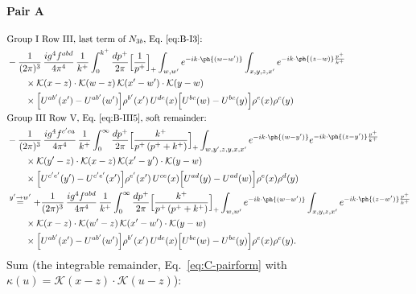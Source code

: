 \paragraph{Pair A}
\begingroup\color{pA}
\begin{align}
&\text{Group I Row III, last term of $N_{3b}$, Eq.~\eqref{eq:B-I3}:}\notag\\
&-\frac{1}{(2\pi)^{3}}\,\frac{ig^{4}f^{abd}}{4\pi^{4}}\,\frac{1}{k^{+}}\int_{0}^{k^{+}}\frac{dp^{+}}{2\pi}\Big[\frac{1}{p^{+}}\Big]_{+}\int_{w,w'}e^{-ik\cdot\ph{(w-w')}}\int_{x,y,z,x'}e^{-ik\cdot\ph{(z-w)}\frac{p^{+}}{k^{+}}}\notag\\
&\qquad\times\mathcal{K}(x-z)\cdot\mathcal{K}(w-z)\,\mathcal{K}(x'-w')\cdot\mathcal{K}(y-w)\notag\\
&\qquad\times\Big[U^{ab'}(x')-U^{ab'}(w')\Big]\rho^{b'}(x')\,U^{de}(x)\Big[U^{bc}(w)-U^{bc}(y)\Big]\rho^{e}(x)\rho^{c}(y)\notag\\
&\text{Group III Row V, Eq.~\eqref{eq:B-III5}, soft remainder:}\notag\\
&-\frac{1}{(2\pi)^{3}}\,\frac{ig^{4}f^{c'ca}}{4\pi^{4}}\,\frac{1}{k^{+}}\int_{0}^{\infty}\frac{dp^{+}}{2\pi}\Big[\frac{k^{+}}{p^{+}\,(p^{+}+k^{+})}\Big]_{+}\int_{w,y',z,y,x,x'}e^{-ik\cdot\ph{(w-y')}}e^{-ik\cdot\ph{(z-y')}\frac{p^{+}}{k^{+}}}\notag\\
&\qquad\times\mathcal{K}(y'-z)\cdot\mathcal{K}(x-z)\,\mathcal{K}(x'-y')\cdot\mathcal{K}(y-w)\notag\\
&\qquad\times\Big[U^{c'e'}(y')-U^{c'e'}(x')\Big]\rho^{e'}(x')\,U^{ce}(x)\Big[U^{ad}(y)-U^{ad}(w)\Big]\rho^{e}(x)\rho^{d}(y)\notag\\
&\overset{y'\to w'}{=}+\frac{1}{(2\pi)^{3}}\,\frac{ig^{4}f^{abd}}{4\pi^{4}}\,\frac{1}{k^{+}}\int_{0}^{\infty}\frac{dp^{+}}{2\pi}\Big[\frac{k^{+}}{p^{+}\,(p^{+}+k^{+})}\Big]_{+}\int_{w,w'}e^{-ik\cdot\ph{(w-w')}}\int_{x,y,z,x'}e^{-ik\cdot\ph{(z-w')}\frac{p^{+}}{k^{+}}}\notag\\
&\qquad\times\mathcal{K}(x-z)\cdot\mathcal{K}(w'-z)\,\mathcal{K}(x'-w')\cdot\mathcal{K}(y-w)\notag\\
&\qquad\times\Big[U^{ab'}(x')-U^{ab'}(w')\Big]\rho^{b'}(x')\,U^{de}(x)\Big[U^{bc}(w)-U^{bc}(y)\Big]\rho^{e}(x)\rho^{c}(y).\notag
\end{align}
\endgroup
Sum (the integrable remainder, Eq.~\eqref{eq:C-pairform} with $\kappa(u)=\mathcal{K}(x-z)\cdot\mathcal{K}(u-z)$):
